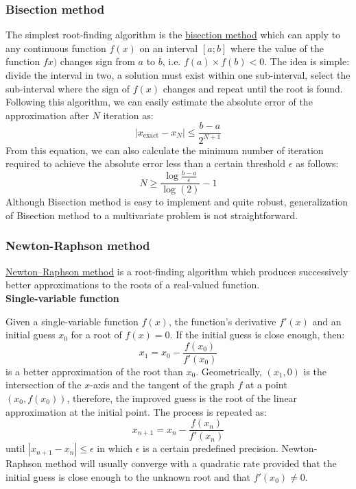 \subsubsection{Bisection method}
The simplest root-finding algorithm is the \href{https://en.wikipedia.org/wiki/Bisection_method}{bisection method} which can apply to any continuous function $f(x)$ on an interval $[a;b]$ where the value of the function $fx)$ changes sign from $a$ to $b$, i.e. $f(a) \times f(b) < 0$. The idea is simple: divide the interval in two, a solution must exist within one sub-interval, select the sub-interval where the sign of $f(x)$ changes and repeat until the root is found. Following this algorithm, we can easily estimate the absolute error of the approximation after $N$ iteration as:
\begin{equation}
	\left| x_{\text{exact}} - x_N \right| \leq \frac{b - a}{2^{N+1}}
\end{equation}
From this equation, we can also calculate the minimum number of iteration required to achieve the absolute error less than a certain threshold $\epsilon$ as follows:
\begin{equation}
	N \geq \frac{\log{\frac{b-a}{\epsilon}}}{\log(2)} - 1
\end{equation}
Although Bisection method is easy to implement and quite robust, generalization of Bisection method to a multivariate problem is not straightforward. 



\subsubsection{Newton-Raphson method}
\href{https://en.wikipedia.org/wiki/Newton's_method}{Newton–Raphson method} is a root-finding algorithm which produces successively better approximations to the roots of a real-valued function.  
\\


\textbf{Single-variable function}

Given a single-variable function $f(x)$, the function's derivative $f'(x)$ and an initial guess $x_0$ for a root of $f(x) = 0$. If the initial guess is close enough, then:
\begin{equation}
	x_1 = x_0 - \frac{f(x_0)}{f'(x_0)}
\end{equation}
is a better approximation of the root than $x_0$. Geometrically, $(x_1,0)$ is the intersection of the $x$-axis and the tangent of the graph $f$ at a point $(x_0,f(x_0))$, therefore, the improved guess is the root of the linear approximation at the initial point. The process is repeated as:
\begin{equation}
	x_{n+1} = x_n - \frac{f(x_n)}{f'(x_n)}
\end{equation}
until $\left| x_{n+1} - x_n \right| \leq \epsilon$ in which $\epsilon$ is a certain predefined precision. Newton-Raphson method will usually converge with a quadratic rate provided that the initial guess is close enough to the unknown root and that $f'(x_0) \neq 0$.
\\

